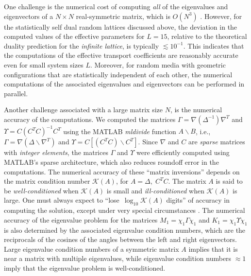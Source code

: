 \documentclass{cmslatex}
\begin{document}
One challenge is the numerical cost of computing \emph{all} of the
eigenvalues and eigenvectors of a $N\times N$ real-symmetric matrix, which
is $O(N^3)$ \cite{Demmel:1997}. However, for the statistically self
dual random lattices discussed above, the deviation in the computed
values of the effective parameters for $L=15$, relative to the
theoretical duality prediction for the \emph{infinite lattice}, is
typically $\lesssim10^{-1}$. This indicates that the computations of the
effective transport coefficients are reasonably accurate even 
for small system sizes $L$. Moreover, for random media with geometric
configurations that are statistically independent of each other, the
numerical computations of the associated eigenvalues and eigenvectors
can be performed in parallel.






Another challenge associated with a large matrix size $N$, is the
numerical accuracy of the computations. We computed the matrices
$\Gamma=\nabla(\Delta^{-1})\nabla^T$ and $\Upsilon=C(C^TC)^{-1}C^T$ using the MATLAB
\emph{mldivide} function $A\backslash B$, i.e., $\Gamma=\nabla(\Delta\backslash \nabla^T)$ and
$\Upsilon=C[(C^TC)\backslash C^T]$. Since $\nabla$ and $C$ are \emph{sparse} matrices with
\emph{integer elements}, the matrices $\Gamma$ and $\Upsilon$ were efficiently
computed using MATLAB's sparse architecture, which also reduces roundoff
error in the computations. The numerical accuracy of these ``matrix
inversions'' depends on the matrix condition number $\mathcal{K}(A)$,
for $A=\Delta,\;C^TC$. The matrix $A$ is said to be
\emph{well-conditioned} when $\mathcal{K}(A)$ is small and
\emph{ill-conditioned} when $\mathcal{K}(A)$ is large. One must always
expect to ``lose $\,\log_{10}\mathcal{K}(A)$ digits'' of accuracy in
computing the solution, except under very special circumstances
\cite{Trefethen:1997:NLA}. The numerical accuracy of the eigenvalue
problem for the matrices $M_1=\chi_1\Gamma\chi_1$ and $K_1=\chi_1\Upsilon\chi_1$ is also determined
by the associated eigenvalue condition numbers, which are the
reciprocals of the cosines of the angles between the left and right
eigenvectors. Large eigenvalue condition numbers of a symmetric matrix
$A$ implies that it is near a matrix with multiple eigenvalues, while
eigenvalue condition numbers $\approx1$ imply that the eigenvalue problem
is well-conditioned. 
\end{document}
